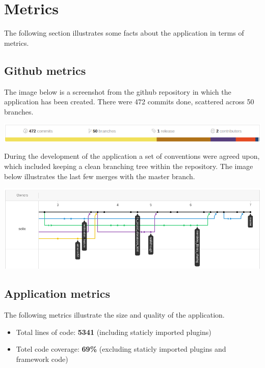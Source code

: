 \section{Metrics}

The following section illustrates some facts about the application in terms of metrics. 

\subsection{Github metrics}

The image below is a screenshot from the github repository in which the application has been created.
There were 472 commits done, scattered across 50 branches.

\begin{center}
\includegraphics[scale=0.5]{./img/github_stats.png}
\end{center}

During the development of the application a set of conventions were agreed upon, which included keeping a clean
branching tree within the repository. The image below illustrates the last few merges with the master branch.

\begin{center}
\includegraphics[scale=0.5]{./img/github_tree.png}
\end{center}

\subsection{Application metrics}

The following metrics illustrate the size and quality of the application.

\begin{itemize}
	\item Total lines of code: \textbf{5341} (including staticly imported plugins)
	\item Totel code coverage: \textbf{69\%} (excluding staticly imported plugins and framework code)
\end{itemize}